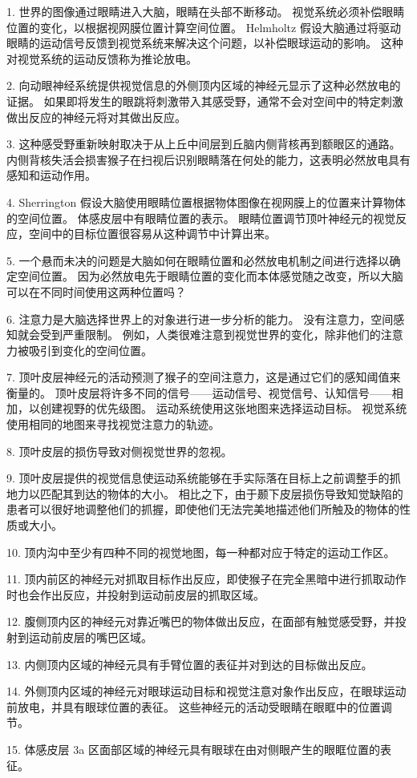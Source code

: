 1. 世界的图像通过眼睛进入大脑，眼睛在头部不断移动。
视觉系统必须补偿眼睛位置的变化，以根据视网膜位置计算空间位置。
Helmholtz 假设大脑通过将驱动眼睛的运动信号反馈到视觉系统来解决这个问题，以补偿眼球运动的影响。
这种对视觉系统的运动反馈称为推论放电。


2. 向动眼神经系统提供视觉信息的外侧顶内区域的神经元显示了这种必然放电的证据。
如果即将发生的眼跳将刺激带入其感受野，通常不会对空间中的特定刺激做出反应的神经元将对其做出反应。


3. 这种感受野重新映射取决于从上丘中间层到丘脑内侧背核再到额眼区的通路。
内侧背核失活会损害猴子在扫视后识别眼睛落在何处的能力，这表明必然放电具有感知和运动作用。


4. Sherrington 假设大脑使用眼睛位置根据物体图像在视网膜上的位置来计算物体的空间位置。
体感皮层中有眼睛位置的表示。
眼睛位置调节顶叶神经元的视觉反应，空间中的目标位置很容易从这种调节中计算出来。


5. 一个悬而未决的问题是大脑如何在眼睛位置和必然放电机制之间进行选择以确定空间位置。
因为必然放电先于眼睛位置的变化而本体感觉随之改变，所以大脑可以在不同时间使用这两种位置吗？


6. 注意力是大脑选择世界上的对象进行进一步分析的能力。
没有注意力，空间感知就会受到严重限制。
例如，人类很难注意到视觉世界的变化，除非他们的注意力被吸引到变化的空间位置。


7. 顶叶皮层神经元的活动预测了猴子的空间注意力，这是通过它们的感知阈值来衡量的。
顶叶皮层将许多不同的信号——运动信号、视觉信号、认知信号——相加，以创建视野的优先级图。
运动系统使用这张地图来选择运动目标。
视觉系统使用相同的地图来寻找视觉注意力的轨迹。


8. 顶叶皮层的损伤导致对侧视觉世界的忽视。


9. 顶叶皮层提供的视觉信息使运动系统能够在手实际落在目标上之前调整手的抓地力以匹配其到达的物体的大小。
相比之下，由于颞下皮层损伤导致知觉缺陷的患者可以很好地调整他们的抓握，即使他们无法完美地描述他们所触及的物体的性质或大小。


10. 顶内沟中至少有四种不同的视觉地图，每一种都对应于特定的运动工作区。


11. 顶内前区的神经元对抓取目标作出反应，即使猴子在完全黑暗中进行抓取动作时也会作出反应，并投射到运动前皮层的抓取区域。


12. 腹侧顶内区的神经元对靠近嘴巴的物体做出反应，在面部有触觉感受野，并投射到运动前皮层的嘴巴区域。 


13. 内侧顶内区域的神经元具有手臂位置的表征并对到达的目标做出反应。


14. 外侧顶内区域的神经元对眼球运动目标和视觉注意对象作出反应，在眼球运动前放电，并具有眼球位置的表征。
这些神经元的活动受眼睛在眼眶中的位置调节。


15. 体感皮层 3a 区面部区域的神经元具有眼球在由对侧眼产生的眼眶位置的表征。

